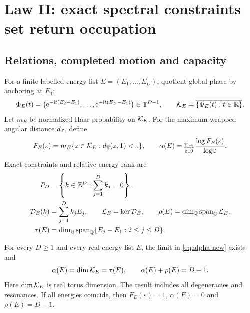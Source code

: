 \section{Law II: exact spectral constraints set return occupation}

\subsection{Relations, completed motion and capacity}

For a finite labelled energy list $E=(E_1,\ldots,E_D)$, quotient global phase
by anchoring at $E_1$:
\begin{equation}
 \Phi_E(t)=\bigl(\mathrm e^{-\mathrm i t(E_2-E_1)},\ldots,
 \mathrm e^{-\mathrm i t(E_D-E_1)}\bigr)\in\mathbb T^{D-1},
 \qquad
 \mathcal K_E=\overline{\{\Phi_E(t):t\in\mathbb R\}}.            \label{eq:phaseorbit-new}
\end{equation}
Let $m_E$ be normalized Haar probability on $\mathcal K_E$.  For the maximum
wrapped angular distance $d_{\mathbb T}$, define
\begin{equation}
 F_E(\varepsilon)=m_E\{z\in\mathcal K_E:
 d_{\mathbb T}(z,\mathbf 1)<\varepsilon\},
 \qquad
 \alpha(E)=\lim_{\varepsilon\downarrow0}
 \frac{\log F_E(\varepsilon)}{\log\varepsilon}.       \label{eq:alpha-new}
\end{equation}
Exact constraints and relative-energy rank are
\begin{align}
 P_D&=\left\{k\in\mathbb Z^D:\sum_{j=1}^D k_j=0\right\},
 \label{eq:projectivecharacters-new}\\
 \mathcal D_E(k)&=\sum_{j=1}^D k_jE_j,
 \qquad \mathcal L_E=\ker\mathcal D_E,
 \qquad
 \rho(E)=\dim_{\mathbb Q}\operatorname{span}_{\mathbb Q}\mathcal L_E,   \label{eq:rho-new}\\
 \tau(E)&=\dim_{\mathbb Q}\operatorname{span}_{\mathbb Q}
 \{E_j-E_1:2\le j\le D\}.                            \label{eq:tau-new}
\end{align}

\begin{theorem}
\label{thm:return-constraint}
For every $D\ge1$ and every real energy list $E$, the limit in
\eqref{eq:alpha-new} exists and
\begin{equation}
 \alpha(E)=\dim\mathcal K_E=\tau(E),
 \qquad \alpha(E)+\rho(E)=D-1.                      \label{eq:rankconservation}
\end{equation}
Here $\dim\mathcal K_E$ is real torus dimension.  The result includes all
degeneracies and resonances.  If all energies coincide, then
$F_E(\varepsilon)=1$, $\alpha(E)=0$ and $\rho(E)=D-1$.
\end{theorem}

